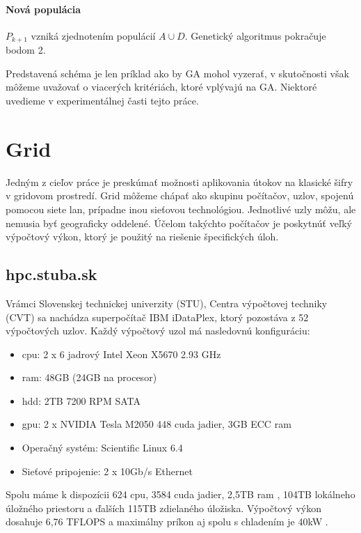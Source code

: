   \paragraph{Nová populácia} $ P_{k+1} $ vzniká zjednotením populácií $ A \cup D $. Genetický algoritmus pokračuje bodom 2.
  
Predstavená schéma je len príklad ako by GA mohol vyzerať, v skutočnosti však môžeme uvažovať o viacerých kritériách, ktoré vplývajú na GA.
Niektoré uvedieme v experimentálnej časti tejto práce.

\section{Grid}
Jedným z cieľov práce je preskúmať možnosti aplikovania útokov na klasické šifry v gridovom prostredí.
Grid môžeme chápať ako skupinu počítačov, uzlov, spojenú pomocou siete \acrfull{lan}, prípadne inou sieťovou technológiou.
Jednotlivé uzly môžu, ale nemusia byť geograficky oddelené.
Účelom takýchto počítačov je poskytnúť veľký výpočtový výkon, ktorý je použitý na riešenie špecifických úloh.

\subsection{hpc.stuba.sk}
Vrámci Slovenskej technickej univerzity (STU), Centra výpočtovej techniky (CVT) sa nachádza superpočítač IBM iDataPlex, ktorý pozostáva z 52 výpočtových uzlov.
Každý výpočtový uzol má nasledovnú konfiguráciu:
\begin{itemize}
\item \acrshort{cpu}: 2 x 6 jadrový Intel Xeon X5670 2.93 GHz
\item \acrshort{ram}: 48GB (24GB na procesor)
\item \acrshort{hdd}: 2TB 7200 RPM SATA
\item \acrshort{gpu}: 2 x NVIDIA Tesla M2050 448 cuda jadier, 3GB ECC \acrshort{ram}
\item Operačný systém: Scientific Linux 6.4
\item Sieťové pripojenie: 2 x 10Gb/s Ethernet
\end{itemize}
Spolu máme k dispozícii 624 \acrshort{cpu}, 3584 cuda jadier, 2,5TB \acrshort{ram} , 104TB lokálneho úložného priestoru a ďalších 115TB zdielaného úložiska.
Výpočtový výkon dosahuje 6,76 TFLOPS a maximálny príkon aj spolu s chladením je 40kW \cite{hpc}.

